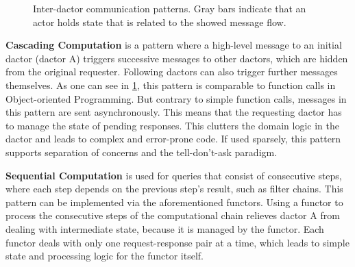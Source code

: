     \begin{figure}
      \centering
      \begin{subfigure}[t]{0.32\textwidth}
        \centering
        
        \label{fig:comp_pattern_1}
      \end{subfigure}\hfill
      \begin{subfigure}[t]{0.32\textwidth}
        \centering
        
        \label{fig:comp_pattern_2}
      \end{subfigure}\hfill
      \begin{subfigure}[t]{0.32\textwidth}
        \centering
        
        \label{fig:comp_pattern_3}
      \end{subfigure}
      \caption{Inter-\gls{dactor} communication patterns. Gray bars indicate that an actor holds state that is related to the showed message flow.}
      \label{fig:comp_patterns}
    \end{figure}

      \textbf{Cascading Computation} is a pattern where a high-level message to an initial \gls{dactor} (\gls{dactor} A) triggers successive messages to other \glspl{dactor}, which are hidden from the original requester.
      Following \glspl{dactor} can also trigger further messages themselves.
      As one can see in \cref{fig:comp_pattern_1}, this pattern is comparable to function calls in Object-oriented Programming.
      But contrary to simple function calls, messages in this pattern are sent asynchronously.
      This means that the requesting \gls{dactor} has to manage the state of pending responses.
      This clutters the domain logic in the \gls{dactor} and leads to complex and error-prone code.
      If used sparsely, this pattern supports separation of concerns and the tell-don't-ask paradigm.

      \textbf{Sequential Computation} is used for queries that consist of consecutive steps, where each step depends on the previous step's result, such as filter chains.
      This pattern can be implemented via the aforementioned \glspl{functor}.
      Using a \gls{functor} to process the consecutive steps of the computational chain relieves \gls{dactor} A from dealing with intermediate state, because it is managed by the \gls{functor}.
      Each \gls{functor} deals with only one request-response pair at a time, which leads to simple state and processing logic for the \gls{functor} itself.

